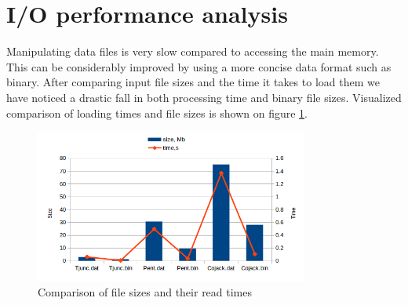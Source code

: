 \documentclass{article}
\begin{document}
\section{I/O performance analysis}
Manipulating data files is very slow compared to accessing the main memory. This can be considerably improved by using a more concise data format such as binary. After comparing input file sizes and the time it takes to load them we have noticed a drastic fall in both processing time and binary file sizes. Visualized comparison of loading times and file sizes is shown on figure \ref{fig:3}.

\begin{figure}[h!]
\begin{center}
\includegraphics[width=0.8\textwidth]{time-size}
\caption{Comparison of file sizes and their read times}
\label{fig:3}
\end{center}
\end{figure}
\end{document}
